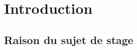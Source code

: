 \documentclass[a4paper, 11pt, french]{report}
\begin{document}
                                                                                                                    \chapter{Introduction}
                                                                                                                      \section*{Raison
                                                                                                                      du
                                                                                                                      sujet
                                                                                                                      de
                                                                                                                      stage}
\end{document}
